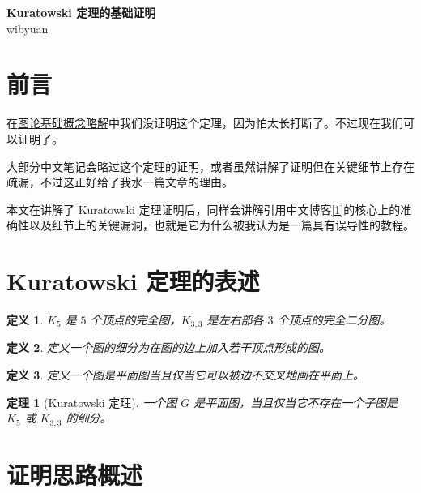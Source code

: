 \documentclass[11pt, a4paper]{ctexart}
\newtheorem{theorem}{定理}
\newtheorem{definition}{定义}
\begin{document}
\begin{center}
    \vspace*{0cm}
    {\huge \bfseries Kuratowski 定理的基础证明} \\[1em]
    {\Large wibyuan} \\[0.5em]
    \vspace*{0cm}
\end{center}

\tableofcontents
\newpage

\section{前言}

在\href{https://zhuanlan.zhihu.com/p/1990379940319875970}{图论基础概念略解}中我们没证明这个定理，因为怕太长打断了。不过现在我们可以证明了。

大部分中文笔记会略过这个定理的证明，或者虽然讲解了证明但在关键细节上存在疏漏，不过这正好给了我水一篇文章的理由。

本文在讲解了 Kuratowski 定理证明后，同样会讲解引用中文博客\hyperlink{ref:csdn}{\footnotesize[1]}的核心上的准确性以及细节上的关键漏洞，也就是它为什么被我认为是一篇具有误导性的教程。

\section{Kuratowski 定理的表述}

\begin{definition}
    $K_5$ 是 $5$ 个顶点的完全图，$K_{3,3}$ 是左右部各 $3$ 个顶点的完全二分图。
\end{definition}

\begin{definition}
    定义一个图的细分为在图的边上加入若干顶点形成的图。
\end{definition}

\begin{definition}
    定义一个图是平面图当且仅当它可以被边不交叉地画在平面上。
\end{definition}

\begin{theorem}[Kuratowski 定理]
    一个图 $G$ 是平面图，当且仅当它不存在一个子图是 $K_5$ 或 $K_{3,3}$ 的细分。
\end{theorem}

\section{证明思路概述}
\end{document}
